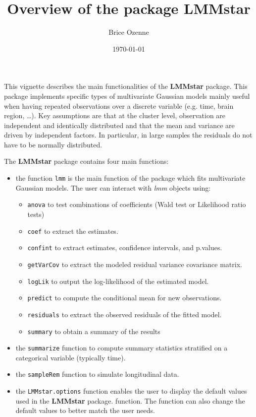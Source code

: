 \documentclass[12pt]{article}
\author{Brice Ozenne}
\date{\today}
\title{Overview of the package LMMstar}
\begin{document}
\maketitle
This vignette describes the main functionalities of the \textbf{LMMstar}
package. This package implements specific types of multivariate
Gaussian models mainly useful when having repeated observations over a
discrete variable (e.g. time, brain region, \ldots{}). Key assumptions are
that at the cluster level, observation are independent and identically
distributed and that the mean and variance are driven by independent
factors. In particular, in large samples the residuals do not have to
be normally distributed.

\bigskip

The \textbf{LMMstar} package contains four main functions:
\begin{itemize}
\item the function \texttt{lmm} is the main function of the package which fits
multivariate Gaussian models. The user can interact with \emph{lmm}
objects using:
\begin{itemize}
\item \texttt{anova} to test combinations of coefficients (Wald test or Likelihood ratio tests)
\item \texttt{coef} to extract the estimates.
\item \texttt{confint} to extract estimates, confidence intervals, and p.values.
\item \texttt{getVarCov} to extract the modeled residual variance covariance matrix.
\item \texttt{logLik} to output the log-likelihood of the estimated model.
\item \texttt{predict} to compute the conditional mean for new observations.
\item \texttt{residuals} to extract the observed residuals of the fitted model.
\item \texttt{summary} to obtain a summary of the results
\end{itemize}
\item the \texttt{summarize} function to compute summary statistics stratified on a categorical variable (typically time).
\item the \texttt{sampleRem} function to simulate longitudinal data.
\item the \texttt{LMMstar.options} function enables the user to display the
default values used in the \textbf{LMMstar} package. function. The function
can also change the default values to better match the user needs.
\end{itemize}
\end{document}

